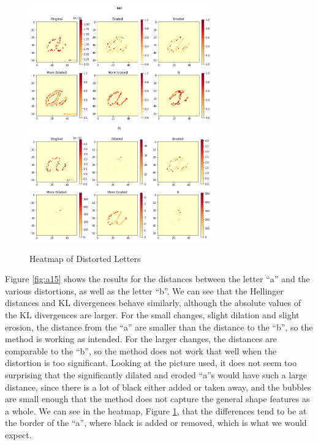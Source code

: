 \documentclass{article}
\begin{document}
\begin{figure}[h!]
\begin{center}
\includegraphics[width=0.7\textwidth]{hell-a.png}
\includegraphics[width=0.7\textwidth]{kl-a.png}
\caption{Heatmap of Distorted Letters}
\label{fig:aheat}
\end{center}
\end{figure}

Figure \ref{fig:a15} shows the results for the distances between the letter ``a'' and the various distortions, as well as the letter ``b''. We can see that the Hellinger distances and KL divergences behave similarly, although the absolute values of the KL divergences are larger. For the small changes, slight dilation and slight erosion, the distance from the ``a'' are smaller than the distance to the ``b'', so the method is working as intended. For the larger changes, the distances are comparable to the ``b'', so the method does not work that well when the distortion is too significant. Looking at the picture used, it does not seem too surprising that the significantly dilated and eroded ``a''s would have such a large distance, since there is a lot of black either added or taken away, and the bubbles are small enough that the method does not capture the general shape features as a whole. We can see in the heatmap, Figure \ref{fig:aheat}, that the differences tend to be at the border of the ``a'', where black is added or removed, which is what we would expect.
\end{document}
